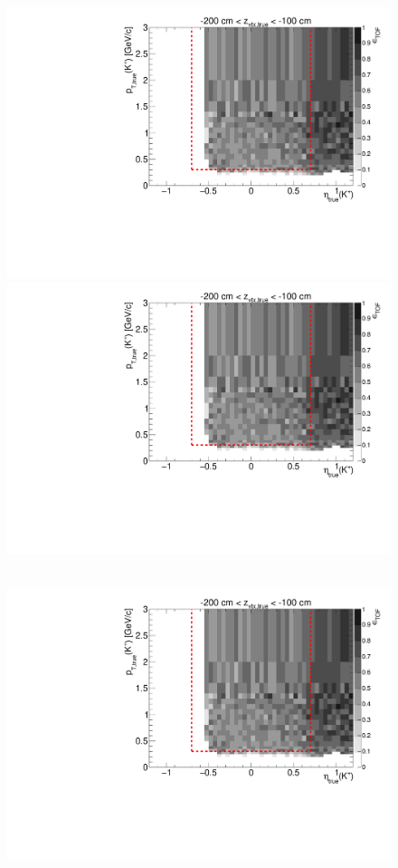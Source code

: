 \begin{figure}[hb]
{  \includegraphics[width=\linewidth,page=7]{graphics/eff/Eff2D_TOF_kaon_Plus.pdf}\\
  \includegraphics[width=\linewidth,page=9]{graphics/eff/Eff2D_TOF_kaon_Plus.pdf}
}~
\parbox{0.495\textwidth}{
  \centering
  \includegraphics[width=\linewidth,page=4]{graphics/eff/Eff2D_TOF_kaon_Plus.pdf}\\
}
\end{figure}
